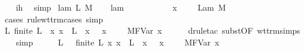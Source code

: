 \begin{isabellebody}
\ \ \isamarkupfalse%
\ ih\ \isamarkupfalse%
\ simp{\isacharplus}\isanewline
{}\isamarkupfalse%
\isanewline
{}\isamarkupfalse%
\ {\isacharparenleft}lam\ L\ M{\isacharparenright}\isanewline
\ \ \isamarkupfalse%
\ lam{\isacharparenleft}{}{\isacharparenright}\ \isamarkupfalse%
\ {\isasympi}\ {\isasymdelta}\ \ {}{\isacharcolon}\ {\isachardoublequoteopen}{\isasymsigma}\ {\isacharequal}\ {\isasympi}\ {\isasymrightarrow}\ {\isasymdelta}{\isachardoublequoteclose}\ {\isachardoublequoteopen}{\isacharparenleft}x{\isacharcomma}\ {\isasymtau}{\isacharparenright}\ {\isacharhash}\ {\isasymGamma}\ {\isasymturnstile}\ Lam\ M\ {\isacharcolon}\ {\isasympi}\ {\isasymrightarrow}\ {\isasymdelta}{\isachardoublequoteclose}\ \isamarkupfalse%
\ {\isacharparenleft}cases\ rule{\isacharcolon}wt{\isacharunderscore}trm{\isachardot}cases{\isacharcomma}\ simp{\isacharparenright}\isanewline
\ \ \isanewline
\ \ \isamarkupfalse%
\ {}{\isacharparenleft}{}{\isacharparenright}\ \isamarkupfalse%
\ {\isachardoublequoteopen}{\isasymexists}L{\isachardot}\ finite\ L\ {\isasymand}\ {\isacharparenleft}{\isasymforall}x{\isacharprime}{\isachardot}\ x{\isacharprime}\ {\isasymnotin}\ L\ {\isasymlongrightarrow}\ {\isacharparenleft}x{\isacharprime}{\isacharcomma}\ {\isasympi}{\isacharparenright}\ {\isacharhash}\ {\isacharparenleft}x{\isacharcomma}\ {\isasymtau}{\isacharparenright}\ {\isacharhash}\ {\isasymGamma}\ {\isasymturnstile}\ M{\isacharcircum}FVar\ x{\isacharprime}\ {\isacharcolon}\ {\isasymdelta}{\isacharparenright}{\isachardoublequoteclose}\isanewline
\ \ \isamarkupfalse%
\ {\isacharparenleft}drule{\isacharunderscore}tac\ subst{\isacharbrackleft}OF\ wt{\isacharunderscore}trm{\isachardot}simps{\isacharbrackright}{\isacharparenright}\isanewline
\ \ \isamarkupfalse%
\ simp\isanewline
\ \ \isamarkupfalse%
\ \isamarkupfalse%
\ L{\isacharprime}\ \ {}{\isacharcolon}\ {\isachardoublequoteopen}finite\ L{\isacharprime}{\isachardoublequoteclose}\ {\isachardoublequoteopen}{\isasymAnd}x{\isacharprime}{\isachardot}\ x{\isacharprime}\ {\isasymnotin}\ L{\isacharprime}\ {\isasymLongrightarrow}\ {\isacharparenleft}x{\isacharprime}{\isacharcomma}\ {\isasympi}{\isacharparenright}\ {\isacharhash}\ {\isacharparenleft}x{\isacharcomma}\ {\isasymtau}{\isacharparenright}\ {\isacharhash}\ {\isasymGamma}\ {\isasymturnstile}\ M{\isacharcircum}FVar\ x{\isacharprime}\ {\isacharcolon}\ {\isasymdelta}{\isachardoublequoteclose}\ \isamarkupfalse%

\end{isabellebody}
